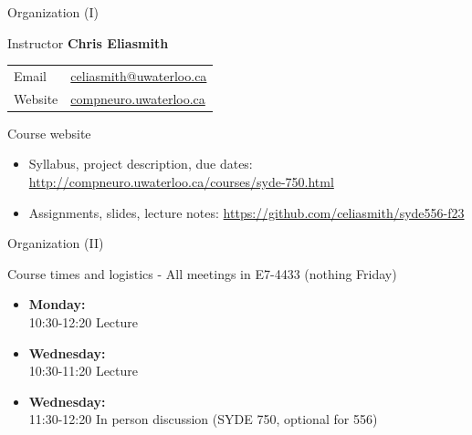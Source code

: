 \documentclass[aspectratio=169]{beamer}
\begin{document}
\begin{frame}{Organization (I)}
	\begin{block}{Instructor}
		\vspace{2mm}
		\textbf{Chris Eliasmith}\\[2mm]
		\hspace{-2.5mm}\begin{tabular}{l l}
			Email & \url{celiasmith@uwaterloo.ca}\\
			Website & \url{compneuro.uwaterloo.ca}\\
		\end{tabular}
	\end{block}
 
	\vfill

	\begin{block}{Course website}
		\begin{itemize}
      \item Syllabus, project description, due dates: \url{http://compneuro.uwaterloo.ca/courses/syde-750.html}
			\item Assignments, slides, lecture notes: \url{https://github.com/celiasmith/syde556-f23}
		\end{itemize}
	\end{block}
\end{frame}

\begin{frame}{Organization (II)}
	\begin{block}{Course times and logistics - All meetings in E7-4433 (nothing Friday)}
		\begin{itemize}
			\item \textbf{Monday:}\\
			10:30-12:20 Lecture
			\item \textbf{Wednesday:}\\
      10:30-11:20 Lecture
			\item \textbf{Wednesday:}\\
			11:30-12:20 In person discussion (SYDE 750, optional for 556) 
		\end{itemize}
	\end{block}

\end{frame}
\end{document}
